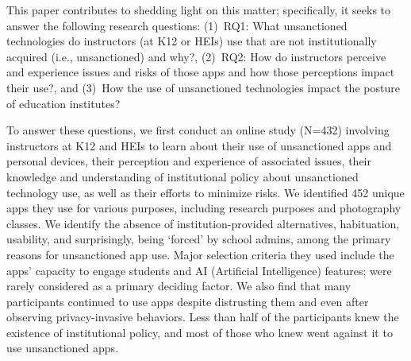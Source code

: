%
This paper contributes to shedding light on this matter; specifically, it seeks to answer the following research questions: (1)~RQ1: What unsanctioned technologies do instructors (at K12 or HEIs) use that are not institutionally acquired (i.e., unsanctioned) and why?, (2)~RQ2: How do instructors perceive and experience \SP issues and risks of those apps and how those perceptions impact their use?, and (3)~How the use of unsanctioned technologies impact the \SP posture of education institutes?

To answer these questions, we first conduct an online study (N=432) involving instructors at K12 and HEIs to learn about their use of unsanctioned apps and personal devices, their perception and experience of associated \SP issues, their knowledge and understanding of institutional policy about unsanctioned technology use, as well as their efforts to minimize \SP risks. We identified 452 unique apps they use for various purposes, including research purposes and photography classes. We identify the absence of institution-provided alternatives, habituation, usability, and surprisingly, being `forced' by school admins, among the primary reasons for unsanctioned app use. Major selection criteria they used include the apps' capacity to engage students and AI (Artificial Intelligence) features; \SP were rarely considered as a primary deciding factor. 
We also find that many participants continued to use apps despite distrusting them and even after observing privacy-invasive behaviors. Less than half of the participants knew the existence of institutional policy, and most of those who knew went against it to use unsanctioned apps. 

